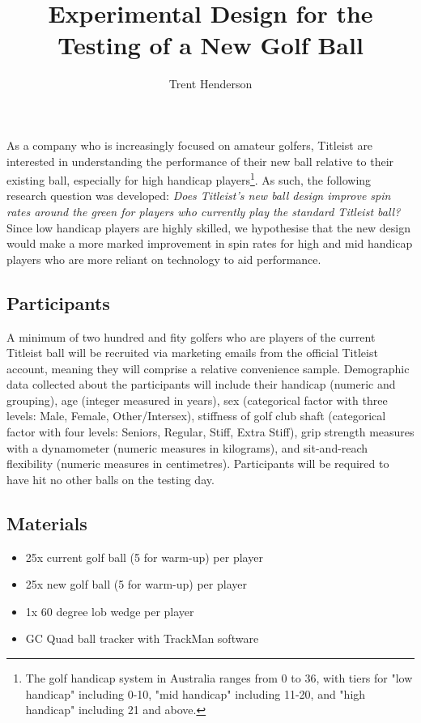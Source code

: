 \documentclass{article}
\begin{document}
\title{\vspace{-4cm}Experimental Design for the Testing of a New Golf Ball}
\author{Trent Henderson}
\date{}

\maketitle

As a company who is increasingly focused on amateur golfers, Titleist are interested in understanding the performance of their new ball relative to their existing ball, especially for high handicap players\footnote{The golf handicap system in Australia ranges from 0 to 36, with tiers for "low handicap" including 0-10, "mid handicap" including 11-20, and "high handicap" including 21 and above.}. 
As such, the following research question was developed: \textit{Does Titleist's new ball design improve spin rates around the green for players who currently play the standard Titleist ball?} 
Since low handicap players are highly skilled, we hypothesise that the new design would make a more marked improvement in spin rates for high and mid handicap players who are more reliant on technology to aid performance.

\subsection*{Participants}

A minimum of two hundred and fity golfers who are players of the current Titleist ball will be recruited via marketing emails from the official Titleist account, meaning they will comprise a relative convenience sample. 
Demographic data collected about the participants will include their handicap (numeric and grouping), age (integer measured in years), sex (categorical factor with three levels: Male, Female, Other/Intersex), stiffness of golf club shaft (categorical factor with four levels: Seniors, Regular, Stiff, Extra Stiff), grip strength measures with a dynamometer (numeric measures in kilograms), and sit-and-reach flexibility (numeric measures in centimetres).
Participants will be required to have hit no other balls on the testing day.

\subsection*{Materials}

\begin{itemize}
    \item 25x current golf ball (5 for warm-up) per player
    \item 25x new golf ball (5 for warm-up) per player
    \item 1x 60 degree lob wedge per player
    \item GC Quad ball tracker with TrackMan software
\end{itemize}
\end{document}
